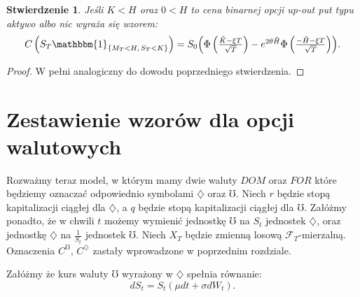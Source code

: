 \documentclass[11pt]{report}
\newtheorem{stw}{Stwierdzenie}[chapter]
\newcommand*{\Scale}[2][4]{\scalebox{#1}{$#2$}}%
\begin{document}
\begin{stw} Jeśli $K < H$ oraz $0<H$ to cena binarnej opcji up-out put typu aktywo albo nic wyraża się wzorem:
\begin{equation*}
C\left( S_T\mathbbm{1}_{\{ M_T<H,\, S_T < K \}} \right) = S_0\Scale[1.0]{\left(\Phi \left(\frac{ \tilde{K}-\xi T }{\sqrt{T}} \right) - e^{2 \theta \tilde{H}}\Phi \left(\frac{ -\tilde{H}-\xi T }{\sqrt{T}}\right) \right)}. 
\end{equation*}
\end{stw}

\begin{proof}
W pełni analogiczny do dowodu poprzedniego stwierdzenia. 
\end{proof}
\section{Zestawienie wzorów dla opcji walutowych}
Rozważmy teraz model, w którym mamy dwie waluty $DOM$ oraz $FOR$ które będziemy oznaczać odpowiednio symbolami $\diamondsuit$ oraz $\mho$. Niech $r$ będzie stopą kapitalizacji ciągłej dla $\diamondsuit$, a $q$ będzie stopą kapitalizacji ciągłej dla $\mho$. Załóżmy ponadto, że w chwili $t$ możemy wymienić jednostkę $\mho$ na $ S_t$ jednostek $\diamondsuit$, oraz jednostkę $\diamondsuit$ na $\frac{1}{S_t}$ jednostek $\mho$. 
Niech $X_T$ będzie zmienną losową $\mathscr{F}_T$-mierzalną.
Oznaczenia $C^{\mho}$, $C^{\diamondsuit}$ zastały wprowadzone w poprzednim rozdziale.


 Załóżmy że kurs waluty $\mho$ wyrażony w $\diamondsuit$ spełnia równanie:
\begin{equation*}
dS_t = S_t(\mu dt + \sigma dW_t).
\end{equation*}
\end{document}
